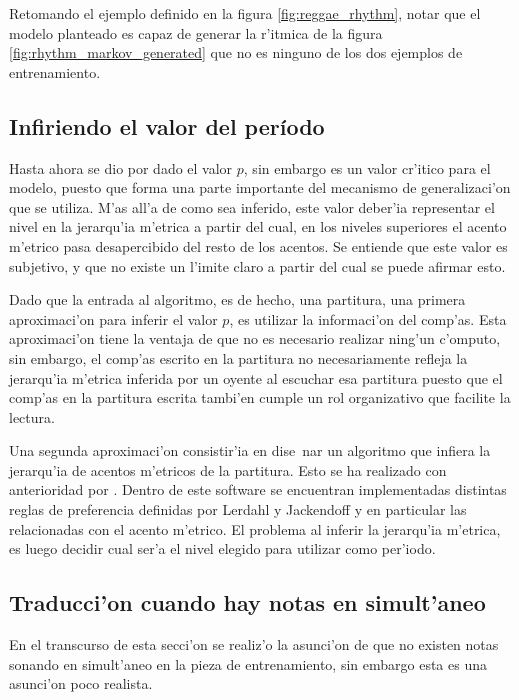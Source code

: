 Retomando el ejemplo definido en la figura \ref{fig:reggae_rhythm}, notar que el modelo planteado es capaz de generar la r'itmica de la figura \ref{fig:rhythm_markov_generated}
que no es ninguno de los dos ejemplos de entrenamiento.

\begin{imagen}
\end{imagen}


\subsection{Infiriendo el valor del per\'iodo}
Hasta ahora se dio por dado el valor $p$, sin embargo es un valor cr'itico para el modelo, puesto que forma una parte importante del mecanismo de generalizaci'on que se 
utiliza. M'as all'a de como sea inferido, este valor deber'ia representar el nivel en la jerarqu'ia m'etrica a partir del cual, en los niveles superiores el acento m'etrico 
pasa desapercibido del resto de los acentos. Se entiende que este valor es subjetivo, y que no existe un l'imite claro a partir del cual se puede afirmar esto.

Dado que la entrada al algoritmo, es de hecho, una partitura, una primera aproximaci'on para inferir el valor $p$, es utilizar la informaci'on del comp'as. 
Esta aproximaci'on tiene la ventaja de que no es necesario realizar ning'un c'omputo, sin embargo, el comp'as escrito en la partitura no necesariamente refleja la jerarqu'ia
m'etrica inferida por un oyente al escuchar esa partitura puesto que el comp'as en la partitura escrita tambi'en cumple un rol organizativo que facilite la lectura. 

Una segunda aproximaci'on consistir'ia en dise~nar un algoritmo que infiera la jerarqu'ia de acentos m'etricos de la partitura. Esto se ha realizado con anterioridad por
\cite{Temperley2001}. Dentro de este software se encuentran implementadas distintas reglas de preferencia definidas por Lerdahl y Jackendoff y 
en particular las relacionadas con el acento m'etrico. El problema al inferir la jerarqu'ia m'etrica, es luego decidir cual ser'a el nivel elegido para utilizar como per'iodo.


\subsection{Traducci'on cuando hay notas en simult'aneo}
En el transcurso de esta secci'on se realiz'o la asunci'on de que no existen notas sonando en simult'aneo en la pieza de entrenamiento, sin embargo esta es una asunci'on poco
realista.


